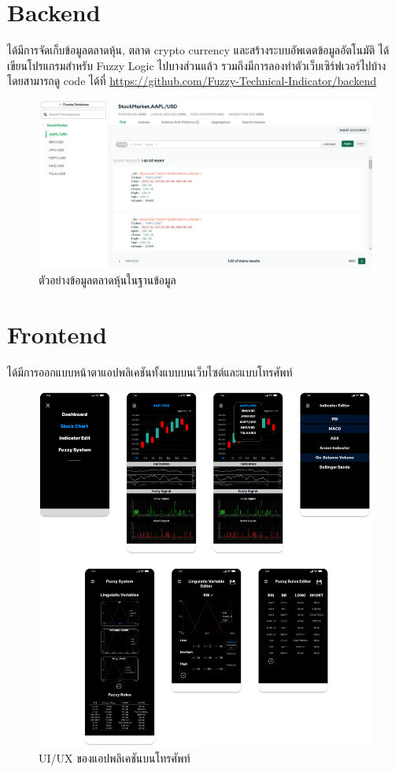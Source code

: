 \section{Backend}
ได้มีการจัดเก็บข้อมูลตลาดหุ้น, ตลาด crypto currency และสร้างระบบอัพเดตข้อมูลอัตโนมัติ ได้เขียนโปรแกรมสำหรับ Fuzzy Logic ไปบางส่วนแล้ว
รวมถึงมีการลองทำตัวเว็บเซิร์ฟเวอร์ไปบ้าง โดยสามารถดู code ได้ที่ \url{https://github.com/Fuzzy-Technical-Indicator/backend}

\begin{figure}[ht]
    \centering
    \includegraphics[width=\textwidth]{images/db_example.png}
    \caption{ตัวอย่างข้อมูลตลาดหุ้นในฐานข้อมูล}
\end{figure}
\pagebreak

\section{Frontend}
ได้มีการออกแบบหน้าตาแอปพลิเคชันทั้งแบบบนเว็บไซต์และแบบโทรศัพท์
\begin{figure}[ht]
    \centering
    \includegraphics[width=\textwidth]{images/mobile_uiux.png}
    \caption{UI/UX ของแอปพลิเคชันบนโทรศัพท์}
\end{figure}


